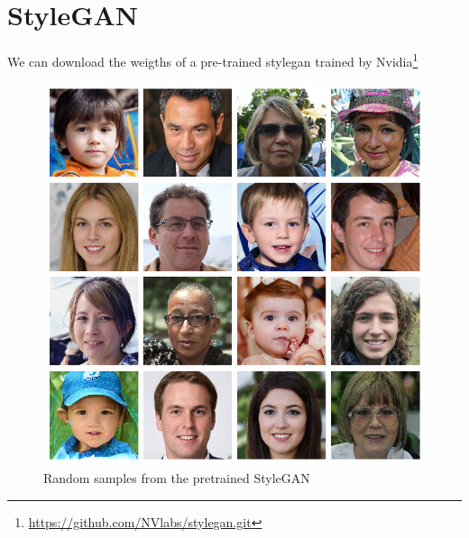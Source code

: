 \section{StyleGAN}

We can download the weigths of a pre-trained stylegan trained by Nvidia\footnote{\url{
https://github.com/NVlabs/stylegan.git}}\cite{stylegan}

\begin{figure}
  \includegraphics[width=\textwidth]{fig/stylegan/stylegan_example}
  \caption{Random samples from the pretrained StyleGAN}
  \label{StyleGAN-examples}
\end{figure}


